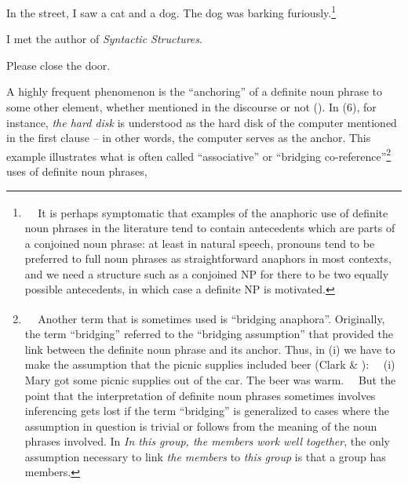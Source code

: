 \begin{listWWNumileveli}
\item 

\begin{styleExample}
\label{bkm:Ref93745057}In the street, I saw a cat and a dog. The dog was barking furiously.\footnote{\textsuperscript{\ \ } It is perhaps symptomatic that examples of the anaphoric use of definite noun phrases in the literature tend to contain antecedents which are parts of a conjoined noun phrase: at least in natural speech, pronouns tend to be preferred to full noun phrases as straightforward anaphors in most contexts, and we need a structure such as a conjoined NP for there to be two equally possible antecedents, in which case a definite NP is motivated.}

\end{styleExample}

\item 

\begin{styleExample}
\label{bkm:Ref93745078}I met the author of \textit{Syntactic Structures}. 

\end{styleExample}

\item 

\begin{styleExample}
\label{bkm:Ref93745091}Please close the door.

\end{styleExample}

\end{listWWNumileveli}

\begin{styleBodyTextFirst}
A highly frequent phenomenon is the “anchoring” of a definite noun phrase to some other element, whether mentioned in the discourse or not (\citet[25]{Fraurud1992}). In (6), for instance, \textit{the hard disk} is understood as the hard disk of the computer mentioned in the first clause – in other words, the computer serves as the anchor.  This example illustrates what is often called “associative” or “bridging co-reference”\footnote{\textsuperscript{\ \ } Another term that is sometimes used is “bridging anaphora”. Originally, the term “bridging” referred to the “bridging assumption” that provided the link between the definite noun phrase and its anchor. Thus, in (i) we have to make the assumption that the picnic supplies included beer (Clark \& \citet{Haviland1974}):
\ \ (i) Mary got some picnic supplies out of the car. The beer was warm. 
\ \ But the point that the interpretation of definite noun phrases sometimes involves inferencing gets lost if the term “bridging” is generalized to cases where the assumption in question is trivial or follows from the meaning of the noun phrases involved. In \textit{In this group, the members work well together}, the only assumption necessary to link \textit{the members} to \textit{this group} is that a group has members. } uses of definite noun phrases,

\end{styleBodyTextFirst}

